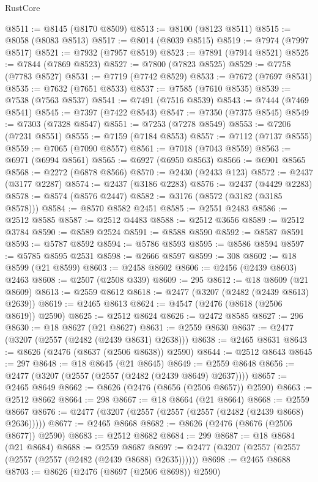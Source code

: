 \begin{lexlean}{RustCore}
\begin{coremodule}
@8511 := @8145 (@8170 @8509)
@8513 := @8100 (@8123 @8511)
@8515 := @8058 (@8083 @8513)
@8517 := @8014 (@8039 @8515)
@8519 := @7974 (@7997 @8517)
@8521 := @7932 (@7957 @8519)
@8523 := @7891 (@7914 @8521)
@8525 := @7844 (@7869 @8523)
@8527 := @7800 (@7823 @8525)
@8529 := @7758 (@7783 @8527)
@8531 := @7719 (@7742 @8529)
@8533 := @7672 (@7697 @8531)
@8535 := @7632 (@7651 @8533)
@8537 := @7585 (@7610 @8535)
@8539 := @7538 (@7563 @8537)
@8541 := @7491 (@7516 @8539)
@8543 := @7444 (@7469 @8541)
@8545 := @7397 (@7422 @8543)
@8547 := @7350 (@7375 @8545)
@8549 := @7303 (@7328 @8547)
@8551 := @7253 (@7278 @8549)
@8553 := @7206 (@7231 @8551)
@8555 := @7159 (@7184 @8553)
@8557 := @7112 (@7137 @8555)
@8559 := @7065 (@7090 @8557)
@8561 := @7018 (@7043 @8559)
@8563 := @6971 (@6994 @8561)
@8565 := @6927 (@6950 @8563)
@8566 := @6901 @8565
@8568 := @2272 (@6878 @8566)
@8570 := @2430 (@2433 @123)
@8572 := @2437 (@3177 @2287)
@8574 := @2437 (@3186 @2283)
@8576 := @2437 (@4429 @2283)
@8578 := @8574 (@8576 @2447)
@8582 := @3176 (@8572 (@3182 (@3185 @8578)))
@8584 := @8570 @8582 @2451
@8585 := @2551 @2483
@8586 := @2512 @8585
@8587 := @2512 @4483
@8588 := @2512 @3656
@8589 := @2512 @3784
@8590 := @8589 @2524
@8591 := @8588 @8590
@8592 := @8587 @8591
@8593 := @5787 @8592
@8594 := @5786 @8593
@8595 := @8586 @8594
@8597 := @5785 @8595 @2531
@8598 := @2666 @8597
@8599 := 308
@8602 := @18 @8599 (@21 @8599)
@8603 := @2458 @8602
@8606 := @2456 (@2439 @8603) @2463
@8608 := @2507 (@2508 @339)
@8609 := 295
@8612 := @18 @8609 (@21 @8609)
@8613 := @2559 @8612
@8618 := @2477 (@3207 (@2482 (@2439 @8613) @2639))
@8619 := @2465 @8613
@8624 := @4547 (@2476 (@8618 (@2506 @8619)) @2590)
@8625 := @2512 @8624
@8626 := @2472 @8585
@8627 := 296
@8630 := @18 @8627 (@21 @8627)
@8631 := @2559 @8630
@8637 := @2477 (@3207 (@2557 (@2482 (@2439 @8631) @2638)))
@8638 := @2465 @8631
@8643 := @8626 (@2476 (@8637 (@2506 @8638)) @2590)
@8644 := @2512 @8643
@8645 := 297
@8648 := @18 @8645 (@21 @8645)
@8649 := @2559 @8648
@8656 := @2477 (@3207 (@2557 (@2557 (@2482 (@2439 @8649) @2637))))
@8657 := @2465 @8649
@8662 := @8626 (@2476 (@8656 (@2506 @8657)) @2590)
@8663 := @2512 @8662
@8664 := 298
@8667 := @18 @8664 (@21 @8664)
@8668 := @2559 @8667
@8676 := @2477 (@3207 (@2557 (@2557 (@2557 (@2482 (@2439 @8668) @2636)))))
@8677 := @2465 @8668
@8682 := @8626 (@2476 (@8676 (@2506 @8677)) @2590)
@8683 := @2512 @8682
@8684 := 299
@8687 := @18 @8684 (@21 @8684)
@8688 := @2559 @8687
@8697 := @2477 (@3207 (@2557 (@2557 (@2557 (@2557 (@2482 (@2439 @8688) @2635))))))
@8698 := @2465 @8688
@8703 := @8626 (@2476 (@8697 (@2506 @8698)) @2590)

\end{coremodule}
\end{lexlean}
